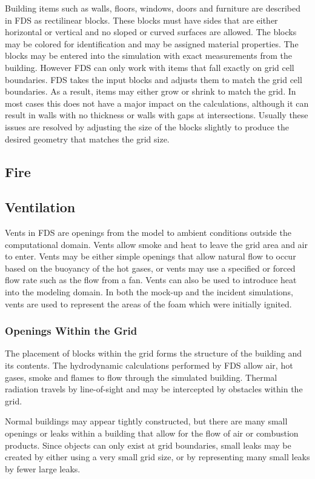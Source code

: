 \documentclass[11pt]{book}
\begin{document}
Building items such as walls, floors, windows, doors and furniture are described in FDS as rectilinear blocks. These blocks must have sides that are either horizontal or vertical and no sloped or curved surfaces are allowed. The blocks may be colored for identification and may be assigned material properties. The blocks may be entered into the simulation with exact measurements from the building. However FDS can only work with items that fall exactly on grid cell boundaries. FDS takes the input blocks and adjusts them to match the grid cell boundaries. As a result, items may either grow or shrink to match the grid. In most cases this does not have a major impact on the calculations, although it can result in walls with no thickness or walls with gaps at intersections. Usually these issues are resolved by adjusting the size of the blocks slightly to produce the desired geometry that matches the grid size.

\subsection{Fire}

\subsection{Ventilation}
Vents in FDS are openings from the model to ambient conditions outside the computational domain. Vents allow smoke and heat to leave the grid area and air to enter. Vents may be either simple openings that allow natural flow to occur based on the buoyancy of the hot gases, or vents may use a specified or forced flow rate such as the flow from a fan. Vents can also be used to introduce heat into the modeling domain. In both the mock-up and the incident simulations, vents are used to represent the areas of the foam which were initially ignited.

\subsubsection{Openings Within the Grid}
The placement of blocks within the grid forms the structure of the building and its contents. The hydrodynamic calculations performed by FDS allow air, hot gases, smoke and flames to flow through the simulated building. Thermal radiation travels by line-of-sight and may be intercepted by obstacles within the grid.

Normal buildings may appear tightly constructed, but there are many small openings or leaks within a building that allow for the flow of air or combustion products. Since objects can only exist at grid boundaries, small leaks may be created by either using a very small grid size, or by representing many small leaks by fewer large leaks.
\end{document}
